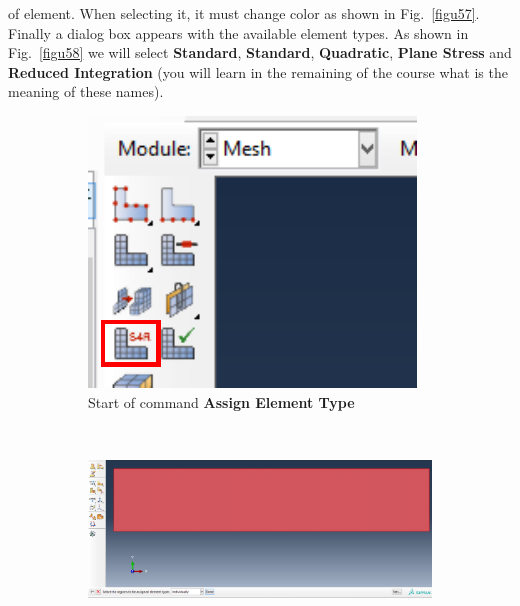 \begin{enumerate}
  of element. When selecting it, it must change color as shown in
  Fig.~\ref{figu57}. Finally a dialog box appears with the available
  element types. As shown in Fig.~\ref{figu58} we will select
  \textbf{Standard}, \textbf{Standard}, \textbf{Quadratic},
  \textbf{Plane Stress} and \textbf{Reduced Integration} (you will
  learn in the remaining of the course what is the meaning of these
  names).
  \begin{figure}[H]
    \centering
    \begin{subfigure}{0.15\textwidth}
      \includegraphics[width=\textwidth]{./body/images/imagen56.pdf}
      \caption{Start of command \textbf{Assign Element Type}}
      \label{figu56}
    \end{subfigure}%
    ~ %
    \begin{subfigure}{0.33\textwidth}
      \includegraphics[width=\textwidth]{./body/images/imagen57}

\end{subfigure}
\end{figure}
\end{enumerate}
